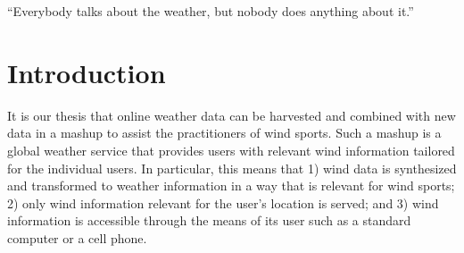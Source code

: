 \begin{savequote}[10pc]
 \sffamily
``Everybody talks about the weather, but nobody does anything about it.''
\end{savequote}
\chapter{Introduction}
It is our thesis that online weather data can be harvested and combined with new
data in a mashup to assist the practitioners of wind sports. Such a mashup is a
global weather service that provides users with relevant wind information
tailored for the individual users. In particular, this means that 1) wind data is
synthesized and transformed to weather information in a way that is relevant for
wind sports; 2) only wind information relevant for the user's location is served;
and 3) wind information is accessible through the means of its user such as a
standard computer or a cell phone.

